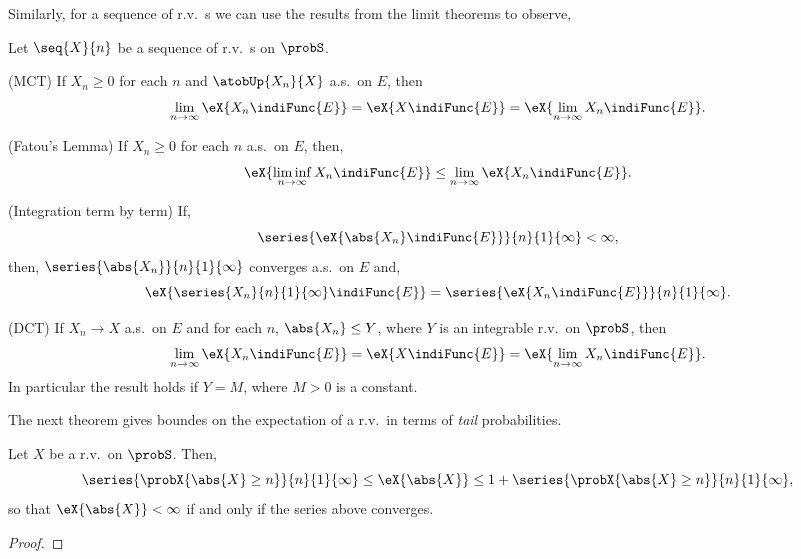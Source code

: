 Similarly, for a sequence of r.v.~s we can use the results from the limit theorems to observe,
\begin{Observation}
    Let $\seq{X}{n}$ be a sequence of r.v.~s on $\probS$.
    \begin{properties}[resume*=expect]
    \item
	(MCT) If $X_n \ge 0$ for each $n$ and $\atobUp{X_n}{X}$ a.s.~on $E$, then
	\[\lim\limits_{n\to\infty}\eX{X_n\indiFunc{E}} = \eX{X\indiFunc{E}} =
	    \eX{\lim\limits_{n\to\infty}X_n\indiFunc{E}}.\]
    \item
	(Fatou's Lemma) If $X_n \ge 0$ for each $n$ a.s.~on $E$, then,
	\[\eX{\liminf\limits_{n\to\infty} X_n\indiFunc{E}} \leq \lim\limits_{n\to\infty}\eX{X_n\indiFunc{E}}.\]
    \item
	(Integration term by term) If,
	\[\series{\eX{\abs{X_n}\indiFunc{E}}}{n}{1}{\infty} < \infty,\]
	then,
	$\series{\abs{X_n}}{n}{1}{\infty}$ converges a.s.~on $E$ and,
	\[\eX{\series{X_n}{n}{1}{\infty}\indiFunc{E}} = \series{\eX{X_n\indiFunc{E}}}{n}{1}{\infty}.\]
    \item
	(DCT) If $X_n\to X$ a.s.~on $E$ and for each $n$, $\abs{X_n} \leq Y$, where $Y$ is an integrable
	r.v.~on $\probS$, then
	\[\lim\limits_{n\to\infty}\eX{X_n\indiFunc{E}} = \eX{X\indiFunc{E}} =
	    \eX{\lim\limits_{n\to\infty}X_n\indiFunc{E}}.\]
	In particular the result holds if $Y = M$, where $M > 0$ is a constant.
    \end{properties}
\end{Observation}
The next theorem gives boundes on the expectation of a r.v.~in terms of \emph{tail} probabilities.
\begin{Theorem}
    Let $X$ be a r.v.~on $\probS$. Then,
    \[\series{\probX{\abs{X}\geq n}}{n}{1}{\infty} \leq \eX{\abs{X}} \leq 
	1 + \series{\probX{\abs{X}\geq n}}{n}{1}{\infty}, \]
    so that $\eX{\abs{X}} < \infty$ if and only if the series above converges.
\end{Theorem}
\begin{proof}
\end{proof}


